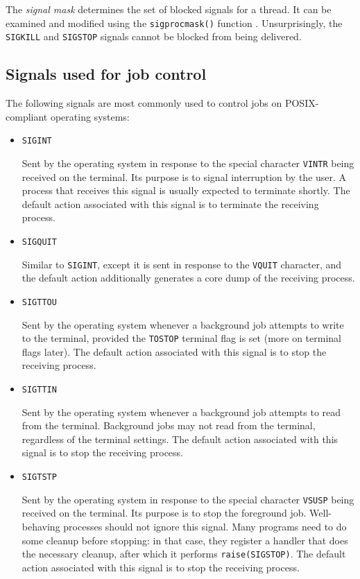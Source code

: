 \documentclass[shortabstract, manyadvisors, english, mgr]{iithesis}
\begin{document}
The \textit{signal mask} determines the set of blocked signals for a thread. It
can be examined and modified using the \texttt{sigprocmask()} function
\cite{sigprocmask}. Unsurprisingly, the \texttt{SIGKILL} and \texttt{SIGSTOP}
signals cannot be blocked from being delivered.

\subsection{Signals used for job control}
\label{job-control-signals}

The following signals are most commonly used to control jobs on POSIX-compliant
operating systems:
\begin{itemize}
\item \texttt{SIGINT}

  Sent by the operating system in response to the special
  character \texttt{VINTR} being received on the terminal. Its purpose is to
  signal interruption by the user. A process that receives this signal is
  usually expected to terminate shortly. The default action associated with this
  signal is to terminate the receiving process.

\item \texttt{SIGQUIT}

  Similar to \texttt{SIGINT}, except it is sent in response to the
  \texttt{VQUIT} character, and the default action additionally generates a core
  dump of the receiving process.

\item \texttt{SIGTTOU}

  Sent by the operating system whenever a background job attempts to write to
  the terminal, provided the \texttt{TOSTOP} terminal flag is set (more on
  terminal flags later). The default action associated with this signal is to
  stop the receiving process.
  
\item \texttt{SIGTTIN}

  Sent by the operating system whenever a background job attempts to read from
  the terminal. Background jobs may not read from the terminal, regardless of
  the terminal settings. The default action associated with this signal is to
  stop the receiving process.

\item \texttt{SIGTSTP}

  Sent by the operating system in response to the special character
  \texttt{VSUSP} being received on the terminal. Its purpose is to stop the
  foreground job. Well-behaving processes should not ignore this signal. Many
  programs need to do some cleanup before stopping: in that case, they register
  a handler that does the necessary cleanup, after which it performs
  \texttt{raise(SIGSTOP)}. The default action associated with this signal is to
  stop the receiving process.


\end{itemize}
\end{document}
